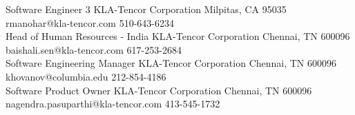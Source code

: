 
    {Software Engineer 3}
    {KLA-Tencor Corporation}
    {Milpitas, CA 95035}
    {}
    {rmanohar@kla-tencor.com}
    {510-643-6234}\\[1em]
    {Head of Human Resources - India}
    {KLA-Tencor Corporation}
    {Chennai, TN 600096}
    {}
    {baishali.sen@kla-tencor.com}
    {617-253-2684}\\[1em]
    {Software Engineering Manager}
    {KLA-Tencor Corporation}
    {Chennai, TN 600096}
    {}
    {khovanov@columbia.edu}
    {212-854-4186}\\[1em]
   	{Software Product Owner}
   	{KLA-Tencor Corporation}
   	{Chennai, TN 600096}
   	{}
   	{nagendra.pasuparthi@kla-tencor.com}
   	{413-545-1732}\\[1em]
   	